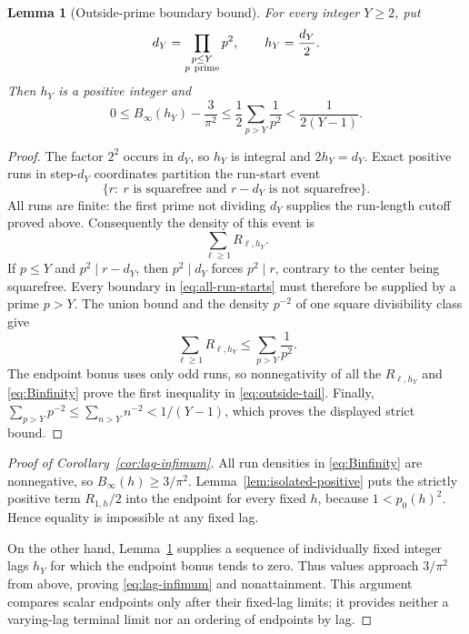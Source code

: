 \documentclass[11pt]{article}
\newtheorem{lemma}[theorem]{Lemma}
\theoremstyle{definition}
\theoremstyle{remark}
\begin{document}
\begin{lemma}[Outside-prime boundary bound]
\label{lem:outside-prime-tail}
For every integer \(Y\geq2\), put
\begin{equation}
 d_Y=\prod_{\substack{p\leq Y\\p\ {\rm prime}}}p^2,
 \qquad h_Y=\frac{d_Y}{2}.
 \label{eq:hY}
\end{equation}
Then \(h_Y\) is a positive integer and
\begin{equation}
 0\leq B_\infty(h_Y)-\frac3{\pi^2}
 \leq\frac12\sum_{p>Y}\frac1{p^2}
 <\frac1{2(Y-1)}.
 \label{eq:outside-tail}
\end{equation}
\end{lemma}

\begin{proof}
The factor \(2^2\) occurs in \(d_Y\), so \(h_Y\) is integral and
\(2h_Y=d_Y\).  Exact positive runs in step-\(d_Y\) coordinates
partition the run-start event
\[
 \{r:\ r\text{ is squarefree and }r-d_Y\text{ is not squarefree}\}.
\]
All runs are finite: the first prime not dividing \(d_Y\) supplies the
run-length cutoff proved above.  Consequently the density of this
event is
\begin{equation}
 \sum_{\ell\geq1}R_{\ell,h_Y}.
 \label{eq:all-run-starts}
\end{equation}
If \(p\leq Y\) and \(p^2\mid r-d_Y\), then \(p^2\mid d_Y\) forces
\(p^2\mid r\), contrary to the center being squarefree.  Every boundary
in \eqref{eq:all-run-starts} must therefore be supplied by a prime
\(p>Y\).  The union bound and the density \(p^{-2}\) of one square
divisibility class give
\[
 \sum_{\ell\geq1}R_{\ell,h_Y}
 \leq\sum_{p>Y}\frac1{p^2}.
\]
The endpoint bonus uses only odd runs, so nonnegativity of all the
\(R_{\ell,h_Y}\) and \eqref{eq:Binfinity} prove the first inequality in
\eqref{eq:outside-tail}.  Finally,
\(\sum_{p>Y}p^{-2}\leq\sum_{n>Y}n^{-2}<1/(Y-1)\), which proves the
displayed strict bound.
\end{proof}

\begin{proof}[Proof of Corollary~\ref{cor:lag-infimum}]
All run densities in \eqref{eq:Binfinity} are nonnegative, so
\(B_\infty(h)\geq3/\pi^2\).  Lemma~\ref{lem:isolated-positive} puts the
strictly positive term \(R_{1,h}/2\) into the endpoint for every fixed
\(h\), because \(1<p_0(h)^2\).  Hence equality is impossible at any
fixed lag.

On the other hand, Lemma~\ref{lem:outside-prime-tail} supplies a
sequence of individually fixed integer lags \(h_Y\) for which the
endpoint bonus tends to zero.  Thus values approach \(3/\pi^2\) from
above, proving \eqref{eq:lag-infimum} and nonattainment.  This argument
compares scalar endpoints only after their fixed-lag limits; it provides
neither a varying-lag terminal limit nor an ordering of endpoints by
lag.
\end{proof}
\end{document}
